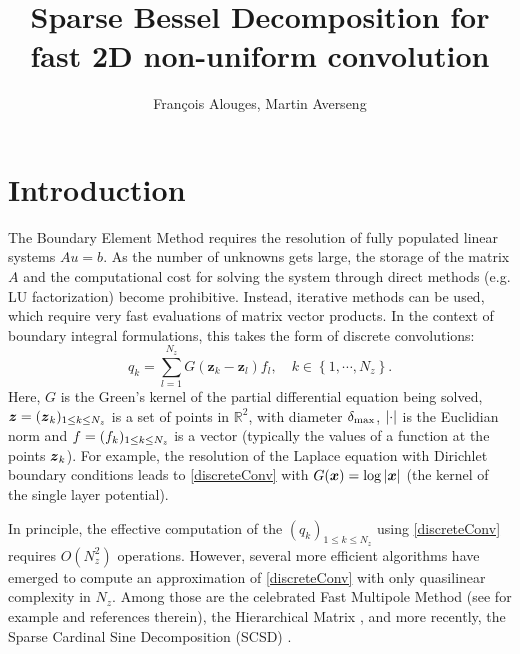 \documentclass[11pt,a4paper]{article}
\author{François Alouges, Martin Averseng}
\title{Sparse Bessel Decomposition for fast 2D non-uniform convolution}
\begin{document}
\maketitle
	
	

\section{Introduction}
The Boundary Element Method requires the resolution of fully populated linear systems $Au = b$. As the number of unknowns gets large, the storage of the matrix $A$ and the computational cost for solving the system through direct methods (e.g. LU factorization) become prohibitive. Instead, iterative methods can be used, which require very fast evaluations of matrix vector products. In the context of boundary integral formulations, this takes the form of discrete convolutions:
\begin{equation}
	q_k = \sum_{l=1}^{N_z} G(\boldsymbol{z}_k - \boldsymbol{z}_l) f_l, \quad k \in \left\{1, \cdots, N_z\right\}.
	\label{discreteConv}					
\end{equation}
Here, $G$ is the Green's kernel of the partial differential equation being solved, $\boldsymbol{z} = (\boldsymbol{z}_{k})_{1 \leq k \leq N_z}$  is a set of points in $\mathbb{R}^2$, with diameter $\delta_{\max}$, $\left\lvert \cdot \right\rvert$ is the Euclidian norm and $f = (f_{k})_{1 \leq k \leq N_z}$ is a vector (typically the values of a function at the points $\boldsymbol{z}_k$). For example, the resolution of the Laplace equation with Dirichlet boundary conditions leads to \eqref{discreteConv} with $G(\boldsymbol{x}) = \log \left\lvert \boldsymbol{x} \right\rvert$ (the kernel of the single layer potential). 

In principle, the effective computation of the $(q_k)_{1 \leq k\leq N_z}$ using \eqref{discreteConv} requires $O(N_z^2)$ operations. However, several more efficient algorithms have emerged to compute an approximation of \eqref{discreteConv} with only quasilinear complexity in $N_z$. Among those are the celebrated Fast Multipole Method (see for example \cite{greengard1988rapid,rokhlin1990rapid, rokhlin1993diagonal, coifman1993fast, cheng1999fast} and references therein), the Hierarchical Matrix \cite{borm2003introduction}, and more recently, the Sparse Cardinal Sine Decomposition (SCSD) \cite{Alouges2015}.
\end{document}
